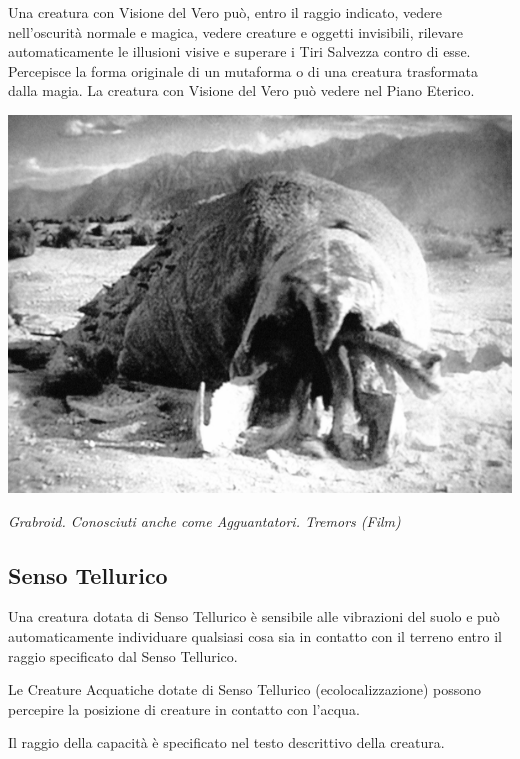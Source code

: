 \begin{multicols}{2}
Una creatura con Visione del Vero può, entro il raggio indicato, vedere nell'oscurità normale e magica, vedere creature e oggetti invisibili, rilevare automaticamente le illusioni visive e superare i Tiri Salvezza contro di esse. Percepisce la forma originale di un mutaforma o di una creatura trasformata dalla magia. La creatura con Visione del Vero può vedere nel Piano Eterico.

\medskip

\begin{center}
\includegraphics[height=0.65\linewidth]{immagini/grabroid.png}

\medskip

\emph{Grabroid. Conosciuti anche come Agguantatori. Tremors (Film)}
\end{center}

\subsection{Senso Tellurico}\label{sensotellurico}
Una creatura dotata di Senso Tellurico è sensibile alle vibrazioni del suolo e può automaticamente individuare qualsiasi cosa sia in contatto con il terreno entro il raggio specificato dal Senso Tellurico.

Le Creature Acquatiche dotate di Senso Tellurico (ecolocalizzazione) possono percepire la posizione di creature in contatto con l'acqua.

Il raggio della capacità è specificato nel testo descrittivo della creatura.

\end{multicols}

\vfill

